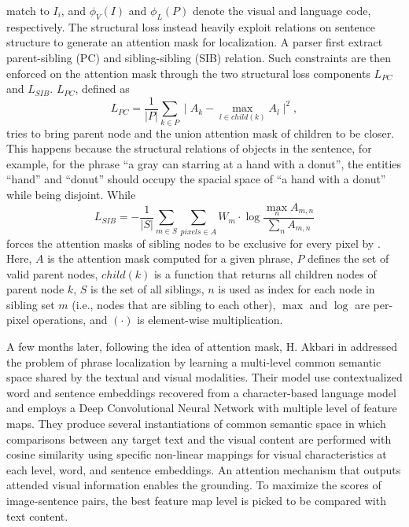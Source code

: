match to $I_i$, and $\phi_V(I)$ and $\phi_L(P)$ denote the visual and
language code, respectively. The structural loss instead heavily
exploit relations on sentence structure to generate an attention mask
for localization. A parser first extract parent-sibling (PC) and
sibling-sibling (SIB) relation. Such constraints are then enforced on
the attention mask through the two structural loss components
$L_{PC}$ and $L_{SIB}$. $L_{PC}$, defined as 
\begin{equation}
  L_{PC} = \frac{1}{|P|} \sum_{k \in P} \mid A_k - \max_{l \in child(k)} A_l \mid ^ 2,
\end{equation}
tries to bring parent node and the union attention mask of children to
be closer. This happens because the structural relations of objects in
the sentence, for example, for the phrase ``a gray can starring at a
hand with a donut'', the entities ``hand'' and ``donut'' should occupy
the spacial space of ``a hand with a donut'' while being disjoint.
While
\begin{equation}
  L_{SIB} = - \frac{1}{|S|} \sum_{m \in S} \sum_{pixels \in A} W_m \cdot \log \frac{\max_n A_{m,n}}{\sum_n A_{m,n}}
\end{equation}
forces the attention masks of sibling nodes to be exclusive for every
pixel by . Here, $A$ is the attention mask computed for a given
phrase, $P$ defines the set of valid parent nodes, $child(k)$ is a
function that returns all children nodes of parent node $k$, $S$ is
the set of all siblings, $n$ is used as index for each node in sibling
set $m$ (i.e., nodes that are sibling to each other), $\max$ and
$\log$ are per-pixel operations, and $(\cdot)$ is element-wise
multiplication.

A few months later, following the idea of attention mask, H. Akbari
\etal{} in \cite{akbari2019multi} addressed the problem of phrase
localization by learning a multi-level common semantic space shared by
the textual and visual modalities. Their model use contextualized word
and sentence embeddings recovered from a character-based language
model and employs a Deep Convolutional Neural Network with multiple
level of feature maps. They produce several instantiations of common
semantic space in which comparisons between any target text and the
visual content are performed with cosine similarity using specific
non-linear mappings for visual characteristics at each level, word,
and sentence embeddings. An attention mechanism that outputs attended
visual information enables the grounding. To maximize the scores of
image-sentence pairs, the best feature map level is picked to be
compared with text content.

